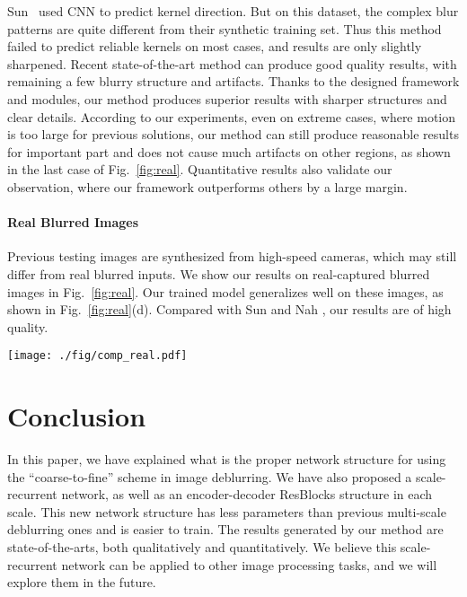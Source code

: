 \documentclass[10pt,twocolumn,letterpaper]{article}
\begin{document}
Sun \etal~used CNN to predict kernel direction. But on this dataset, the complex blur patterns are quite different from their synthetic training set. Thus this method failed to predict reliable kernels on most cases, and results are only slightly sharpened. Recent state-of-the-art method \cite{nah2017deep} can produce good quality results, with remaining a few blurry structure and artifacts. Thanks to the designed framework and modules, our method produces superior results with sharper structures and clear details. According to our experiments, even on extreme cases, where motion is too large for previous solutions, our method can still produce reasonable results for important part and does not cause much artifacts on other regions, as shown in the last case of Fig.~\ref{fig:real}. Quantitative results also validate our observation, where our framework outperforms others by a large margin.

\paragraph{Real Blurred Images} Previous testing images are synthesized from high-speed cameras, which may still differ from real blurred inputs. We show our results on real-captured blurred images in Fig.~\ref{fig:real}. Our trained model generalizes well on these images, as shown in Fig.~\ref{fig:real}(d). Compared with Sun \etal and Nah \etal, our results are of high quality.

\begin{figure*}[h]
  \begin{center}
\texttt{[image: ./fig/comp\_real.pdf]}
  \end{center}
  \vspace{-0.17in}
  \caption{Real blurred images.}\label{fig:real}
\end{figure*}

\section{Conclusion}
\vspace{-0.09in}
In this paper, we have explained what is the proper network structure for using the ``coarse-to-fine'' scheme in image deblurring. 
We have also proposed a scale-recurrent network, as well as an encoder-decoder ResBlocks structure in each scale.
This new network structure has less parameters than previous multi-scale deblurring ones and is easier to train. The results generated by our method are state-of-the-arts, both qualitatively and quantitatively. We believe this scale-recurrent network can be applied to other image processing tasks, and we will explore them in the future. 


{\small


}
\end{document}
